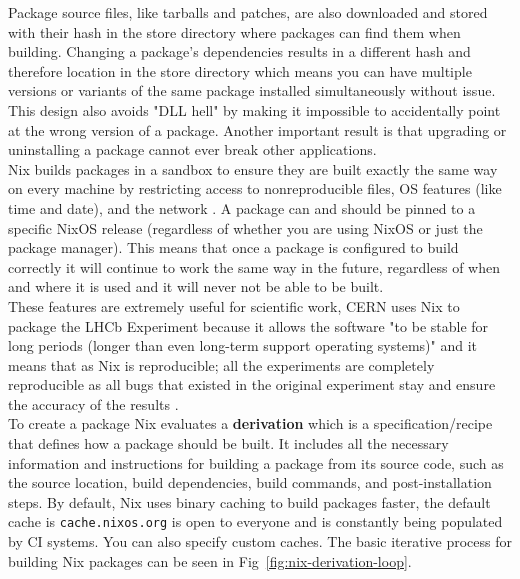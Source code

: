 Package source files, like tarballs and patches, are also downloaded and stored with their hash in the store directory where packages can find them when building. Changing a package's dependencies results in a different hash and therefore location in the store directory which means you can have multiple versions or variants of the same package installed simultaneously without issue. This design also avoids "DLL hell" by making it impossible to accidentally point at the wrong version of a package. Another important result is that upgrading or uninstalling a package cannot ever break other applications. \\

Nix builds packages in a sandbox to ensure they are built exactly the same way on every machine by restricting access to nonreproducible files, OS features (like time and date), and the network \cite{nixcon-sandboxs}. A package can and should be pinned to a specific NixOS release (regardless of whether you are using NixOS or just the package manager). This means that once a package is configured to build correctly it will continue to work the same way in the future, regardless of when and where it is used and it will never not be able to be built. \\

These features are extremely useful for scientific work, CERN uses Nix to package the LHCb Experiment because it allows the software "to be stable for long periods (longer than even long-term support operating systems)" and it means that as Nix is reproducible; all the experiments are completely reproducible as all bugs that existed in the original experiment stay and ensure the accuracy of the results \cite{LHCbNix}. \\

To create a package Nix evaluates a \textbf{derivation} which is a specification/recipe that defines how a package should be built. It includes all the necessary information and instructions for building a package from its source code, such as the source location, build dependencies, build commands, and post-installation steps. By default, Nix uses binary caching to build packages faster, the default cache is \texttt{cache.nixos.org} is open to everyone and is constantly being populated by CI systems. You can also specify custom caches. The basic iterative process for building Nix packages can be seen in Fig~\ref{fig:nix-derivation-loop}.

